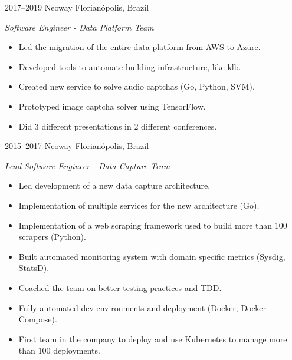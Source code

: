 \documentclass[]{friggeri-cv} %
\begin{document}
\begin{entrylist}
\entry
{2017--2019}
{Neoway}
{Florianópolis, Brazil}
{\emph{Software Engineer - Data Platform Team} \\

\begin{itemize}
  \item Led the migration of the entire data platform from AWS to Azure.
  \item Developed tools to automate building infrastructure, like {\href{https://github.com/NeowayLabs/klb}{klb}}.
  \item Created new service to solve audio captchas (Go, Python, SVM).
  \item Prototyped image captcha solver using TensorFlow.
  \item Did 3 different presentations in 2 different conferences.
\end{itemize}
}
\end{entrylist}

\begin{entrylist}
\entry
{2015--2017}
{Neoway}
{Florianópolis, Brazil}
{\emph{Lead Software Engineer - Data Capture Team} \\

\begin{itemize}
  \item Led development of a new data capture architecture.
  \item Implementation of multiple services for the new architecture (Go).
  \item Implementation of a web scraping framework used to build more than 100 scrapers (Python).
  \item Built automated monitoring system with domain specific metrics (Sysdig, StatsD).
  \item Coached the team on better testing practices and TDD.
  \item Fully automated dev environments and deployment (Docker, Docker Compose).
  \item First team in the company to deploy and use Kubernetes to manage more than 100 deployments.
\end{itemize}
}
\end{entrylist}
\end{document}
